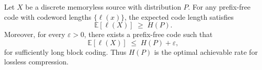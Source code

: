\documentclass[../main]{subfiles}
\begin{document}
        \begin{theorem}
            Let $X$ be a discrete memoryless source with distribution $P$.  
            For any prefix-free code with codeword lengths $\{\ell(x)\}$, the
            expected code length satisfies
            \begin{equation}
                \mathbb{E}[\ell(X)] \;\ge\; H(P).
            \end{equation}
            Moreover, for every $\varepsilon>0$, there exists a prefix-free code such that
            \begin{equation}
                \mathbb{E}[\ell(X)] \;\le\; H(P)+\varepsilon,
            \end{equation}
            for sufficiently long block coding.  
            Thus $H(P)$ is the optimal achievable rate for lossless compression.
            \end{theorem}
\end{document}
